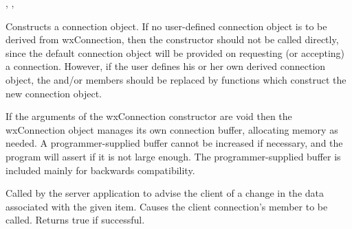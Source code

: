 
, ,


\label{wxconnectionctor}



Constructs a connection object. If no user-defined connection
object is to be derived from wxConnection, then the constructor
should not be called directly, since the default connection
object will be provided on requesting (or accepting) a
connection. However, if the user defines his or her own derived
connection object, the \rtfsp
and/or  
members should be replaced by functions which construct the new
connection object.

If the arguments of the wxConnection constructor are void then
the wxConnection object manages its own connection buffer,
allocating memory as needed. A programmer-supplied buffer cannot
be increased if necessary, and the program will assert if it is
not large enough. The programmer-supplied buffer is included
mainly for backwards compatibility.

\label{wxconnectionadvise}





Called by the server application to advise the client of a change
in the data associated with the given item. Causes the client
connection's  member
to be called. Returns true if successful.

